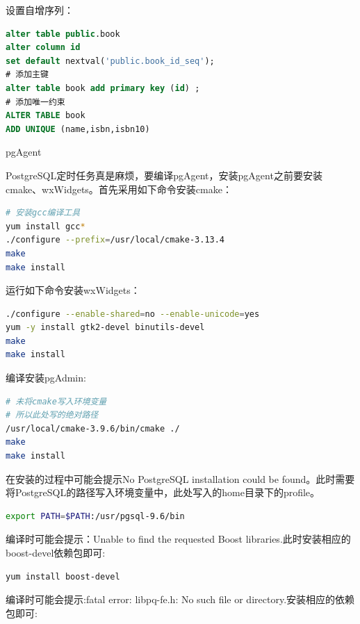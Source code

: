 \documentclass[8pt]{book}
\makeatletter
\numberwithin{dummy}{section}
\theoremstyle{ocrenumbox}
\theoremstyle{blacknumex}
\theoremstyle{blacknumbox}
\theoremstyle{ocrenum}
\renewcommand{\subsection}{\@startsection {subsection}{2}{\z@}
	{-3ex \@plus -0.1ex \@minus -.4ex}
	{0.5ex \@plus.2ex }
	{\normalfont\sffamily\bfseries}}
\makeatother
\begin{document}
设置自增序列：

\begin{lstlisting}[language=SQL]
alter table public.book 
alter column id 
set default nextval('public.book_id_seq');
# 添加主键
alter table book add primary key (id) ;
# 添加唯一约束
ALTER TABLE book
ADD UNIQUE (name,isbn,isbn10)
\end{lstlisting}

\subsection{pgAgent}

PostgreSQL定时任务真是麻烦，要编译pgAgent，安装pgAgent之前要安装cmake、wxWidgets。首先采用如下命令安装cmake：

\begin{lstlisting}[language=Bash]
# 安装gcc编译工具
yum install gcc*
./configure --prefix=/usr/local/cmake-3.13.4
make
make install
\end{lstlisting}

运行如下命令安装wxWidgets：

\begin{lstlisting}[language=Bash]
./configure --enable-shared=no --enable-unicode=yes
yum -y install gtk2-devel binutils-devel
make
make install
\end{lstlisting}

编译安装pgAdmin:

\begin{lstlisting}[language=Bash]
# 未将cmake写入环境变量
# 所以此处写的绝对路径
/usr/local/cmake-3.9.6/bin/cmake ./
make
make install
\end{lstlisting}

在安装的过程中可能会提示No PostgreSQL installation could be found。此时需要将PostgreSQL的路径写入环境变量中，此处写入的home目录下的profile。

\begin{lstlisting}[language=Bash]
export PATH=$PATH:/usr/pgsql-9.6/bin
\end{lstlisting}

编译时可能会提示：Unable to find the requested Boost libraries.此时安装相应的boost-devel依赖包即可:

\begin{lstlisting}[language=Bash]
yum install boost-devel
\end{lstlisting}

编译时可能会提示:fatal error: libpq-fe.h: No such file or directory.安装相应的依赖包即可:
\end{document}

